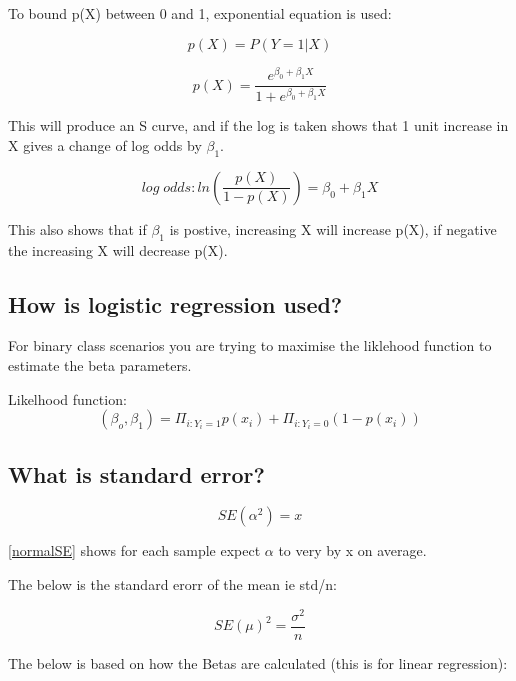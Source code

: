 \documentclass[11pt]{scrartcl} %
\begin{document}
To bound p(X) between 0 and 1, exponential equation is used:

\begin{equation}
	p(X) = P(Y=1|X)
\end{equation}

\begin{equation}
	p(X) = \frac{e^{\beta_0 + \beta_1X}}{1+e^{\beta_0 + \beta_1X}}
\end{equation}

This will produce an S curve, and if the log is taken shows that 1 unit increase in X gives a change of log odds by 
\( \beta_1\).

\begin{equation}
	log\; odds: ln(\frac{p(X)}{1-p(X)}) = \beta_0 + \beta_1X
\end{equation}

This also shows that if \(\beta_1\) is postive, increasing X will increase p(X), if negative the increasing X will
decrease p(X).

\subsection{How is logistic regression used?}

For binary class scenarios you are trying to maximise the liklehood function to estimate the beta parameters.

Likelhood function:
\begin{equation}
	(\beta_o,\beta_1) = \Pi_{i:Y_i=1}p(x_i) + \Pi_{i:Y_i=0}(1-p(x_i))
\end{equation}

\subsection{What is standard error?}

\begin{equation}
	SE(\alpha^2) = x
	\label{normalSE}
\end{equation}

\ref{normalSE} shows for each sample expect \(\alpha\) to very by x on average.

The below is the standard erorr of the mean ie std/n:

\begin{equation}
	SE(\mu)^2 = \frac{\sigma^2}{n}
\end{equation}

The below is based on how the Betas are calculated (this is for linear regression):
\end{document}
